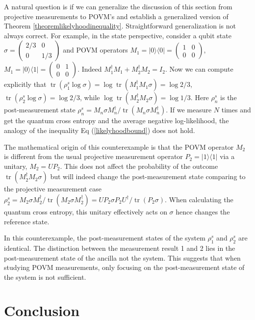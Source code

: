 \documentclass[11pt]{article}
\theoremstyle{definition}
\DeclareMathOperator{\tr}{\text{tr}}
\begin{document}
A natural question is if we can generalize the discussion of this section from projective measurements to POVM's and establish a generalized version of Theorem \ref{theoremlikelyhoodinequality}. Straightforward generalization is not always correct. For example, in the state perspective, consider a qubit state $\sigma=\begin{pmatrix}2/3&0\\0&1/3\end{pmatrix}$ and POVM operators $M_1=|0\rangle\langle0|=\begin{pmatrix}1&0\\0&0\end{pmatrix}$, $M_1=|0\rangle\langle1|=\begin{pmatrix}0&1\\0&0\end{pmatrix}$. Indeed $M_1^\dagger M_1 +M_2^\dagger M_2=I_2$. Now we can compute explicitly that $\tr(\rho_1^s\log\sigma)=\log\tr(M_1^\dagger M_1\sigma)=\log 2/3$, $\tr(\rho_2^s\log\sigma)=\log 2/3$, while $\log\tr(M_2^\dagger M_2\sigma)=\log 1/3$. Here $\rho_n^s$ is the post-measurement state $\rho_n^s=M_n \sigma M_n^\dagger /\tr(M_n \sigma M_n^\dagger)$. If we measure $N$ times and get the quantum cross entropy and the average negative log-likelihood, the analogy of the inequality Eq (\ref{likelyhoodbound}) does not hold. 

The mathematical origin of this counterexample is that the POVM operator $M_2$ is different from the usual projective measurement operator $P_2=|1\rangle\langle1|$ via a unitary, $M_2=U P_2$. This does not affect the probability of the outcome $\tr(M^\dagger_2 M_2 \sigma)$ but will indeed change the post-measurement state comparing to the projective measurement case $\rho_2^s=M_2 \sigma M_2^\dagger /\tr(M_2 \sigma M_2^\dagger)=U P_2 \sigma P_2 U^\dagger /\tr(P_2 \sigma)$. When calculating the quantum cross entropy, this unitary effectively acts on $\sigma$ hence changes the reference state.


In this counterexample, the post-measurement states of the system $\rho_1^s$ and $\rho_2^s$ are identical. The distinction between the measurement result 1 and 2 lies in the post-measurement state of the ancilla not the system. This suggests that when studying POVM measurements, only focusing on the post-measurement state of the system is not sufficient.




\section{Conclusion}
\end{document}
